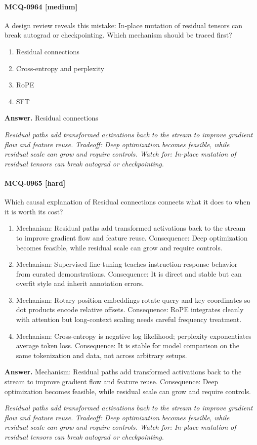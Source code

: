 \paragraph{MCQ-0964 [medium]} A design review reveals this mistake: In-place mutation of residual tensors can break autograd or checkpointing. Which mechanism should be traced first?
\begin{enumerate}[label=\Alph*.]
\item Residual connections
\item Cross-entropy and perplexity
\item RoPE
\item SFT
\end{enumerate}
\noindent\textbf{Answer.} Residual connections
\par\textit{Residual paths add transformed activations back to the stream to improve gradient flow and feature reuse. Tradeoff: Deep optimization becomes feasible, while residual scale can grow and require controls. Watch for: In-place mutation of residual tensors can break autograd or checkpointing.}
\paragraph{MCQ-0965 [hard]} Which causal explanation of Residual connections connects what it does to when it is worth its cost?
\begin{enumerate}[label=\Alph*.]
\item Mechanism: Residual paths add transformed activations back to the stream to improve gradient flow and feature reuse. Consequence: Deep optimization becomes feasible, while residual scale can grow and require controls.
\item Mechanism: Supervised fine-tuning teaches instruction-response behavior from curated demonstrations. Consequence: It is direct and stable but can overfit style and inherit annotation errors.
\item Mechanism: Rotary position embeddings rotate query and key coordinates so dot products encode relative offsets. Consequence: RoPE integrates cleanly with attention but long-context scaling needs careful frequency treatment.
\item Mechanism: Cross-entropy is negative log likelihood; perplexity exponentiates average token loss. Consequence: It is stable for model comparison on the same tokenization and data, not across arbitrary setups.
\end{enumerate}
\noindent\textbf{Answer.} Mechanism: Residual paths add transformed activations back to the stream to improve gradient flow and feature reuse. Consequence: Deep optimization becomes feasible, while residual scale can grow and require controls.
\par\textit{Residual paths add transformed activations back to the stream to improve gradient flow and feature reuse. Tradeoff: Deep optimization becomes feasible, while residual scale can grow and require controls. Watch for: In-place mutation of residual tensors can break autograd or checkpointing.}
